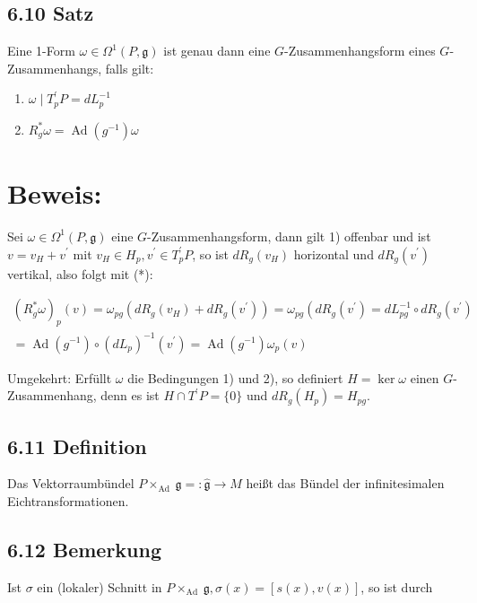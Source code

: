 \subsection*{6.10 Satz}
Eine 1-Form $\omega \in \Omega^{1}(P, \mathfrak{g})$ ist genau dann eine $G$-Zusammenhangsform eines $G$-Zusammenhangs, falls gilt:

\begin{enumerate}
  \item $\omega \mid T_{p}^{\prime} P=d L_{p}^{-1}$
  \item $R_{g}^{*} \omega=\operatorname{Ad}\left(g^{-1}\right) \omega$
\end{enumerate}

\section*{Beweis:}
Sei $\omega \in \Omega^{1}(P, \mathfrak{g})$ eine $G$-Zusammenhangsform, dann gilt 1) offenbar und ist $v=v_{H}+v^{\prime}$ mit $v_{H} \in H_{p}, v^{\prime} \in T_{p}^{\prime} P$, so ist $d R_{g}\left(v_{H}\right)$ horizontal und $d R_{g}\left(v^{\prime}\right)$ vertikal, also folgt mit (*):

$$
\begin{gathered}
\left(R_{g}^{*} \omega\right)_{p}(v)=\omega_{p g}\left(d R_{g}\left(v_{H}\right)+d R_{g}\left(v^{\prime}\right)\right)=\omega_{p g}\left(d R_{g}\left(v^{\prime}\right)=d L_{p g}^{-1} \circ d R_{g}\left(v^{\prime}\right)\right. \\
=\operatorname{Ad}\left(g^{-1}\right) \circ\left(d L_{p}\right)^{-1}\left(v^{\prime}\right)=\operatorname{Ad}\left(g^{-1}\right) \omega_{p}(v)
\end{gathered}
$$

Umgekehrt: Erfüllt $\omega$ die Bedingungen 1) und 2), so definiert $H=\operatorname{ker} \omega$ einen $G$-Zusammenhang, denn es ist $H \cap T^{\prime} P=\{0\}$ und $d R_{g}\left(H_{p}\right)=H_{p g}$.

\subsection*{6.11 Definition}
Das Vektorraumbündel $P \times_{\text {Ad }} \mathfrak{g}=: \hat{\mathfrak{g}} \rightarrow M$ heißt das Bündel der infinitesimalen Eichtransformationen.

\subsection*{6.12 Bemerkung}
Ist $\sigma$ ein (lokaler) Schnitt in $P \times_{\text {Ad }} \mathfrak{g}, \sigma(x)=[s(x), v(x)]$, so ist durch

